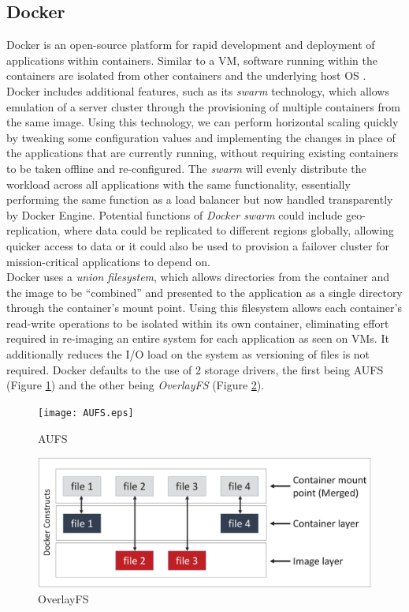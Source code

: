\documentclass[a4paper,12pt]{article}
\begin{document}
	\subsection{Docker}
	{\par Docker is an open-source platform for rapid development and deployment of applications within containers. Similar to a \ac{VM}, software running within the containers are isolated from other containers and the underlying host \ac{OS} \cite{DockerSec}. \\
		\newline
		Docker includes additional features, such as its \textit{swarm} technology, which allows emulation of a server cluster through the provisioning of multiple containers from the same image. Using this technology, we can perform horizontal scaling quickly by tweaking some configuration values and implementing the changes in place of the applications that are currently running, without requiring existing containers to be taken offline and re-configured. The \textit{swarm} will evenly distribute the workload across all applications with the same functionality, essentially performing the same function as a load balancer but now handled transparently by Docker Engine. Potential functions  of \textit{Docker swarm} could include  geo-replication, where data could be replicated to different regions globally, allowing quicker access to data or it could also be used to provision a failover cluster for mission-critical applications to depend on. \\
		\newline
		Docker uses a \textit{union filesystem}, which allows directories from the container and the image to be ``combined'' and presented to the application as a single directory through the container's mount point. Using this filesystem allows each container's read-write operations to be isolated within its own container, eliminating effort required in re-imaging an entire system for each application as seen on \ac{VM}s. It additionally reduces the \ac{I/O} load on the system as versioning of files is not required. Docker defaults to the use of 2 storage drivers, the first being \ac{AUFS} (Figure \ref{fig:aufs}) and the other being \textit{OverlayFS} (Figure \ref{fig:overlayfs}).	
	\begin{figure}[H]
		\centering
		\texttt{[image: AUFS.eps]}
		\caption[AUFS]{\ac{AUFS}}
		\label{fig:aufs}
	\end{figure}
	\begin{figure}[H]
		\centering
		\includegraphics[width=0.8\linewidth]{OverlayFS}
		\caption{OverlayFS}
		\label{fig:overlayfs}
	\end{figure}
	
}
\end{document}
